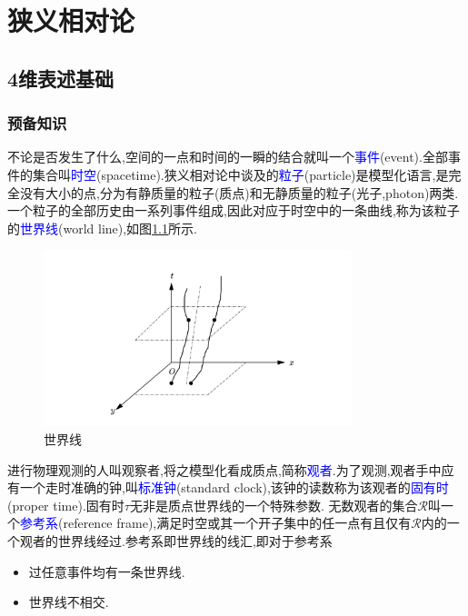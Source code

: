 \chapter{狭义相对论}
\section{4维表述基础}
\subsection{预备知识}
不论是否发生了什么,空间的一点和时间的一瞬的结合就叫一个\textcolor{blue}{事件}(event).全部事件的集合叫\textcolor{blue}{时空}(spacetime).狭义相对论中谈及的\textcolor{blue}{粒子}(particle)是模型化语言,是完全没有大小的点,分为有静质量的粒子(质点)和无静质量的粒子(光子,photon)两类.一个粒子的全部历史由一系列事件组成,因此对应于时空中的一条曲线,称为该粒子的\textcolor{blue}{世界线}(world line),如图\ref{fig:6-1}所示.
\begin{figure}[htbp]
    \centering
 \includegraphics[width=0.8\textwidth]{img/6-1.png}
    \caption{世界线}
    \label{fig:6-1}
\end{figure}

进行物理观测的人叫观察者,将之模型化看成质点,简称\textcolor{blue}{观者}.为了观测,观者手中应有一个走时准确的钟,叫\textcolor{blue}{标准钟}(standard clock),该钟的读数称为该观者的\textcolor{blue}{固有时}(proper time).固有时$\tau$无非是质点世界线的一个特殊参数.
无数观者的集合$\mathscr{R}$叫一个\textcolor{blue}{参考系}(reference frame),满足时空或其一个开子集中的任一点有且仅有$\mathscr{R}$内的一个观者的世界线经过.参考系即世界线的线汇,即对于参考系
\begin{itemize}
\item 过任意事件均有一条世界线.
\item 世界线不相交.
\end{itemize}

